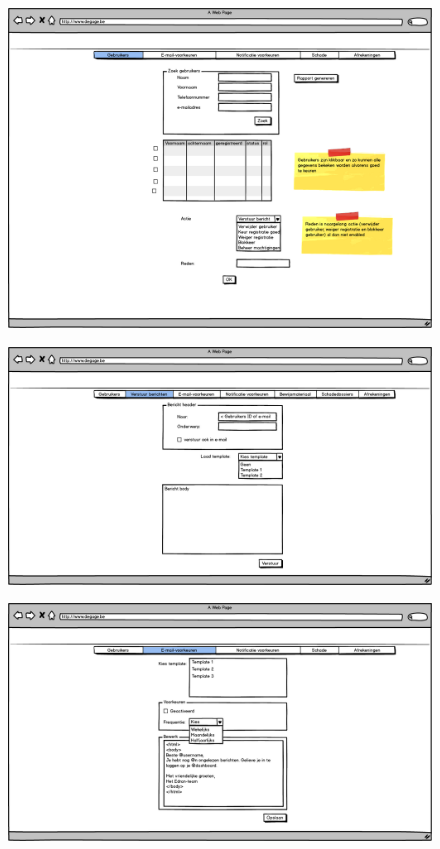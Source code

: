 \documentclass[11pt,a4paper,oneside]{article}
\begin{document}
\begin{figure}[H]\includegraphics[width=\textwidth]{../../mockups/admin_dashboard_gebruikers.png}\end{figure}
\begin{figure}[H]\includegraphics[width=\textwidth]{../../mockups/admin_dashboard_stuur_bericht.png}\end{figure}
\begin{figure}[H]\includegraphics[width=\textwidth]{../../mockups/admin_dashboard_mailvoorkeuren.png}\end{figure}
\end{document}
